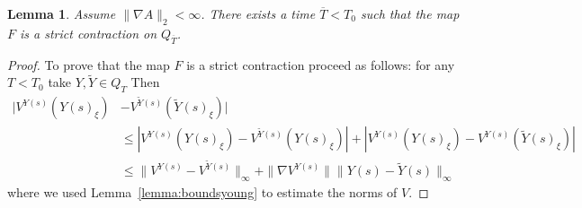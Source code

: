 \documentclass[a4paper,12pt,reqno]{amsart}
\newcommand{\wt}{\widetilde}
\newcommand{\norm}[1]{\|#1\|}
\newtheorem{lemma}{Lemma}
\begin{document}
\begin{lemma}
\label{lemma:uniqueness-young}
 Assume $\|\nabla A\|_2 < \infty$.
There exists a time $\overline{T} < T_0$ such that the
map $F$ is a strict contraction on $Q_{\overline{T}}$.
\end{lemma}
\begin{proof}
To prove that the map $F$ is a strict contraction  proceed as follows:
for any $T < T_0$ take
$Y,\wt Y \in Q_{T}$
Then
\begin{equation*}
  \begin{split}
 |V^{Y(s)}(Y(s)_\xi) & - V^{\wt Y(s)}(\wt Y(s)_\xi)|
\\ & \le |V^{Y(s)}(Y(s)_\xi) - V^{\wt Y(s)}( Y(s)_\xi)| +|
  V^{ Y(s)}(Y(s)_\xi) - V^{ Y(s)}(\wt Y(s)_\xi)  |
\\ & \le \| V^{Y(s)} - V^{\wt Y(s)}\|_\infty + \|\nabla V^{ Y(s)}\|
  \|Y(s)-\wt Y(s)\|_{\infty}
  \end{split}
\end{equation*}
where we used Lemma~\ref{lemma:boundsyoung} to estimate the norms of $V$.


\end{proof}
\end{document}
